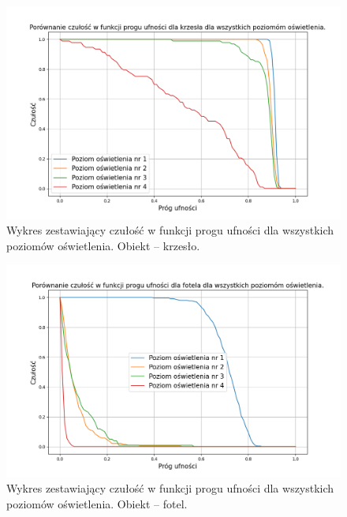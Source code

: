 \begin{figure}[H]
    \centering
    \includegraphics[width=\linewidth]{r_test_dokładności/chair_charts/chair.png}
    \caption{Wykres zestawiający czułość w funkcji progu ufności dla wszystkich poziomów oświetlenia. Obiekt -- krzesło.}
    \label{fig:all_bright_chair}
\end{figure}

\begin{figure}[H]
    \centering
    \includegraphics[width=\linewidth]{r_test_dokładności/chair_charts/gaming-chair.png}
    \caption{Wykres zestawiający czułość w funkcji progu ufności dla wszystkich poziomów oświetlenia. Obiekt --  fotel.}
    \label{fig:all_bright_game}
\end{figure}